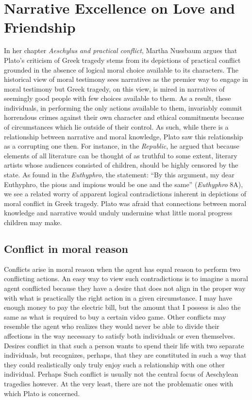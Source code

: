 \documentclass[phdthesis,12pt,final,a4paper]{wuthesis}
\theoremstyle{definition}
\theoremstyle{definition}
\theoremstyle{definition}
\theoremstyle{definition}
\theoremstyle{remark}
\begin{document}
\section{Narrative Excellence on Love and Friendship}\label{narrative-excellence-on-love-and-friendship}

In her chapter \emph{Aeschylus and practical conflict}, Martha Nussbaum argues that Plato's criticism of Greek tragedy stems from its depictions of practical conflict grounded in the absence of logical moral choice available to its characters. The historical view of moral testimony sees narratives as the premier way to engage in moral testimony but Greek tragedy, on this view, is mired in narratives of seemingly good people with few choices available to them. As a result, these individuals, in performing the only actions available to them, invariably commit horrendous crimes against their own character and ethical commitments because of circumstances which lie outside of their control. As such, while there is a relationship between narrative and moral knowledge, Plato saw this relationship as a corrupting one then. For instance, in the \emph{Republic}, he argued that because elements of all literature can be thought of as truthful to some extent, literary artists whose audiences consisted of children, should be highly censored by the state. As found in the \emph{Euthyphro}, the statement: ``By this argument, my dear Euthyphro, the pious and impious would be one and the same'' (\emph{Euthyphro} 8A), we see a related worry of apparent logical contradictions inherent in depictions of moral conflict in Greek tragedy. Plato was afraid that connections between moral knowledge and narrative would unduly undermine what little moral progress children may make.

\subsection*{Conflict in moral reason}\label{conflict-in-moral-reason}

Conflicts arise in moral reason when the agent has equal reason to perform two conflicting actions. An easy way to view such contradictions is to imagine a moral agent conflicted because they have a desire that does not align in the proper way with what is practically the right action in a given circumstance. I may have enough money to pay the electric bill, but the amount that I possess is also the same as what is required to buy a certain video game. Other conflicts may resemble the agent who realizes they would never be able to divide their affections in the way necessary to satisfy both individuals or even themselves. Desires conflict in that such a person wants to spend their life with two separate individuals, but recognizes, perhaps, that they are constituted in such a way that they could realistically only truly enjoy such a relationship with one other individual. Perhaps Such conflict is usually not the central focus of Aeschylean tragedies however. At the very least, there are not the problematic ones with which Plato is concerned.
\end{document}
